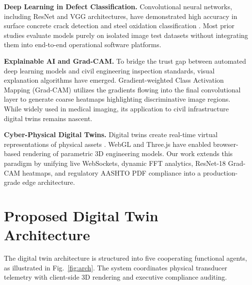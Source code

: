 \documentclass[10pt, conference, letterpaper]{IEEEtran}
\begin{document}
\textbf{Deep Learning in Defect Classification.} Convolutional neural networks, including ResNet \cite{he2016deep} and VGG architectures, have demonstrated high accuracy in surface concrete crack detection and steel oxidation classification \cite{cha2017deep}. Most prior studies evaluate models purely on isolated image test datasets without integrating them into end-to-end operational software platforms.

\textbf{Explainable AI and Grad-CAM.} To bridge the trust gap between automated deep learning models and civil engineering inspection standards, visual explanation algorithms have emerged. Gradient-weighted Class Activation Mapping (Grad-CAM) \cite{selvaraju2017grad} utilizes the gradients flowing into the final convolutional layer to generate coarse heatmaps highlighting discriminative image regions. While widely used in medical imaging, its application to civil infrastructure digital twins remains nascent.

\textbf{Cyber-Physical Digital Twins.} Digital twins create real-time virtual representations of physical assets \cite{grieves2017digital}. WebGL and Three.js \cite{cabrera2019three} have enabled browser-based rendering of parametric 3D engineering models. Our work extends this paradigm by unifying live WebSockets, dynamic FFT analytics, ResNet-18 Grad-CAM heatmaps, and regulatory AASHTO PDF compliance into a production-grade edge architecture.

\section{Proposed Digital Twin Architecture}

The digital twin architecture is structured into five cooperating functional agents, as illustrated in Fig.~\ref{fig:arch}. The system coordinates physical transducer telemetry with client-side 3D rendering and executive compliance auditing.
\end{document}
